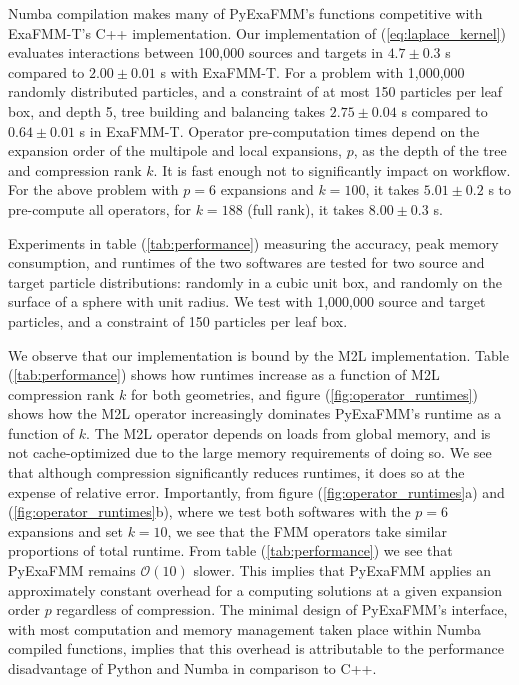 \documentclass{IEEEcsmag}
\begin{document}
Numba compilation makes many of PyExaFMM's functions competitive with ExaFMM-T's C++ implementation. Our implementation of (\ref{eq:laplace_kernel}) evaluates interactions between 100,000 sources and targets in $4.7 \pm 0.3$ s compared to $2.00 \pm 0.01$ s with ExaFMM-T. For a problem with 1,000,000 randomly distributed particles, and a constraint of at most 150 particles per leaf box, and depth 5, tree building and balancing takes $2.75 \pm 0.04$ s compared to $0.64 \pm 0.01$ s in ExaFMM-T. Operator pre-computation times depend on the expansion order of the multipole and local expansions, $p$, as the depth of the tree and compression rank $k$. It is fast enough not to significantly impact on workflow. For the above problem with $p=6$ expansions and $k=100$, it takes $5.01 \pm 0.2$ s to pre-compute all operators, for $k=188$ (full rank), it takes $8.00 \pm 0.3$ s.

Experiments in table (\ref{tab:performance}) measuring the accuracy, peak memory consumption, and runtimes of the two softwares are tested for two source and target particle distributions: randomly in a cubic unit box, and randomly on the surface of a sphere with unit radius. We test with 1,000,000 source and target particles, and a constraint of 150 particles per leaf box.

We observe that our implementation is bound by the M2L implementation. Table (\ref{tab:performance}) shows how runtimes increase as a function of M2L compression rank $k$ for both geometries, and figure (\ref{fig:operator_runtimes}) shows how the M2L operator increasingly dominates PyExaFMM's runtime as a function of $k$. The M2L operator depends on loads from global memory, and is not cache-optimized due to the large memory requirements of doing so. We see that although compression significantly reduces runtimes, it does so at the expense of relative error. Importantly, from figure (\ref{fig:operator_runtimes}a) and (\ref{fig:operator_runtimes}b), where we test both softwares with the $p=6$ expansions and set $k=10$, we see that the FMM operators take similar proportions of total runtime. From table (\ref{tab:performance}) we see that PyExaFMM remains $\mathcal{O}(10)$ slower. This implies that PyExaFMM applies an approximately constant overhead for a computing solutions at a given expansion order $p$ regardless of compression. The minimal design of PyExaFMM's interface, with most computation and memory management taken place within Numba compiled functions, implies that this overhead is attributable to the performance disadvantage of Python and Numba in comparison to C++.
\end{document}
